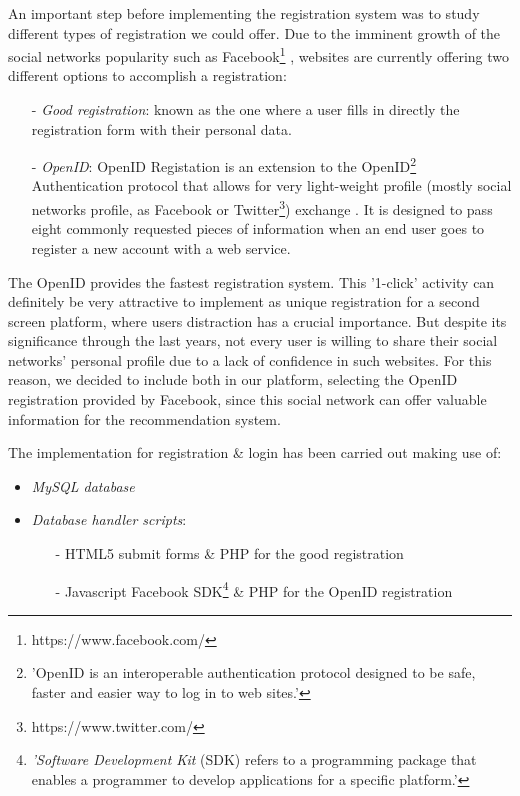 \documentclass{acm_proc_article-sp}
\begin{document}
An important step before implementing the registration system was to study different types of registration we could offer. Due to the imminent growth of the social networks popularity such as Facebook\footnote{https://www.facebook.com/} \cite{shih2009facebook}, websites are currently offering two different options to accomplish a registration:

\begin{itemize}
  	\item [-]\textit{Good registration}: known as the one where a user fills in directly the registration form with their personal data. 
	\item [-]\textit{OpenID}: OpenID Registation is an extension to the OpenID\cite{w3c:openid}\footnote{'OpenID is an interoperable authentication protocol designed to be safe, faster and easier way to log in to web sites.'} Authentication protocol that allows for very light-weight profile (mostly social networks profile, as Facebook or Twitter\footnote{https://www.twitter.com/}) exchange . It is designed to pass eight commonly requested pieces of information when an end user goes to register a new account with a web service. 
\end{itemize}

The OpenID provides the fastest registration system. This '1-click' activity can definitely be very attractive to implement as unique registration for a second screen platform\cite{allen2012smashing}, where users distraction has a crucial importance. But despite its significance through the last years, not every user is willing to share their social networks' personal profile due to a lack of confidence in such websites\cite{pu2006trust}. For this reason, we decided to include both in our platform, selecting the OpenID registration provided by Facebook, since this social network can offer valuable information for the recommendation system. 


The implementation for registration \& login has been carried out making use of:

\begin{itemize}
  	\item \textit{MySQL database}
	\item \textit{Database handler scripts}: 
	\begin{itemize}
  		\item [-]HTML5 submit forms \& PHP for the good registration 
		\item [-]Javascript Facebook SDK\cite{web:sdk}\footnote{\textit{'Software Development Kit} (SDK) refers to a programming package that enables a programmer to develop applications for a specific platform.'} \& PHP for the OpenID registration 
	\end{itemize}
\end{itemize}
\end{document}
